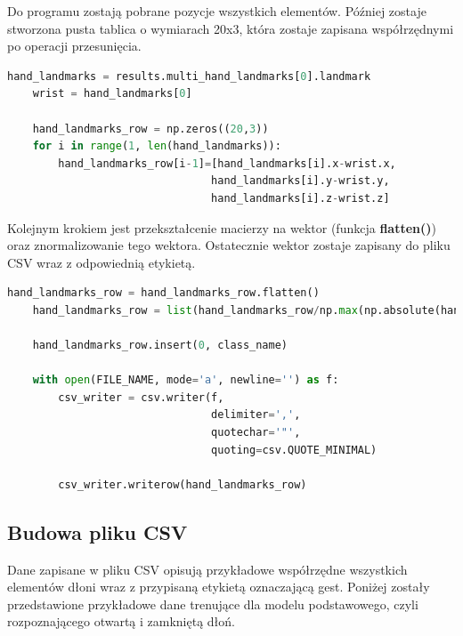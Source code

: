 \quad Do programu zostają pobrane pozycje wszystkich elementów. Później zostaje stworzona pusta tablica o wymiarach 20x3, która zostaje zapisana współrzędnymi po operacji przesunięcia. \newline

\begin{lstlisting}[language=python, style=programming, captionpos=b, caption={Przygotowanie wektora danych}]
    hand_landmarks = results.multi_hand_landmarks[0].landmark
    wrist = hand_landmarks[0]

    hand_landmarks_row = np.zeros((20,3))
    for i in range(1, len(hand_landmarks)):
        hand_landmarks_row[i-1]=[hand_landmarks[i].x-wrist.x, 
                                hand_landmarks[i].y-wrist.y, 
                                hand_landmarks[i].z-wrist.z]
\end{lstlisting}

\quad Kolejnym krokiem jest przekształcenie macierzy na wektor (funkcja \textbf{flatten()}) oraz znormalizowanie tego wektora. Ostatecznie wektor zostaje zapisany do pliku CSV wraz z odpowiednią etykietą. \newline

\begin{lstlisting}[language=python, style=programming, captionpos=b, caption={Przygotowane wektora danych}]
    hand_landmarks_row = hand_landmarks_row.flatten()
    hand_landmarks_row = list(hand_landmarks_row/np.max(np.absolute(hand_landmarks_row)))
    
    hand_landmarks_row.insert(0, class_name)
    
    with open(FILE_NAME, mode='a', newline='') as f:
        csv_writer = csv.writer(f, 
                                delimiter=',', 
                                quotechar='"', 
                                quoting=csv.QUOTE_MINIMAL)

        csv_writer.writerow(hand_landmarks_row)
\end{lstlisting}

\subsection{Budowa pliku CSV}
\quad Dane zapisane w pliku CSV opisują przykładowe współrzędne wszystkich elementów dłoni wraz z przypisaną etykietą oznaczającą gest. Poniżej zostały przedstawione przykładowe dane trenujące dla modelu podstawowego, czyli rozpoznającego otwartą i zamkniętą dłoń. \newline


